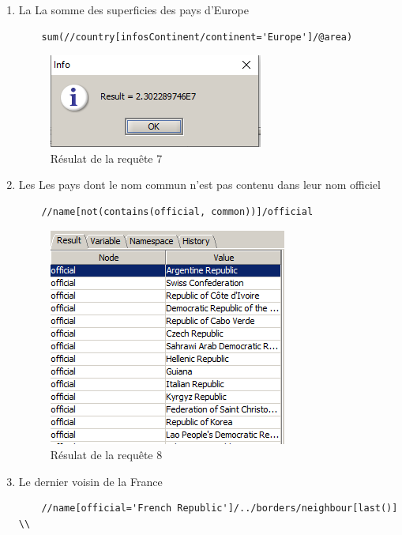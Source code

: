 \documentclass{article}
\begin{document}
\begin{enumerate}[1)]
  

\item La La somme des superficies des pays d'Europe\\
    \begin{lstlisting}
    sum(//country[infosContinent/continent='Europe']/@area)
    \end{lstlisting}

   
    \begin{figure}[h!]
    \centering
    \includegraphics[scale=1]{query7.PNG}
    \caption{Résulat de la requête 7}
    \end{figure}

\item Les Les pays dont le nom commun n'est pas contenu dans leur nom officiel\\
    \begin{lstlisting}
    //name[not(contains(official, common))]/official
    \end{lstlisting}
    
 
    \begin{figure}[h!]
    \centering
    \includegraphics[scale=1]{query8.PNG}
    \caption{Résulat de la requête 8}
    \end{figure}


\item Le dernier voisin de la France\\
    \begin{lstlisting}
    //name[official='French Republic']/../borders/neighbour[last()] \\
    \end{lstlisting}
    

\end{enumerate}
\end{document}
